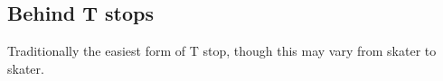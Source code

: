\subsection*{Behind T stops}
\label{sec:stopping/t_stops/behind}

Traditionally the easiest form of T stop, though this may vary from skater to skater.

